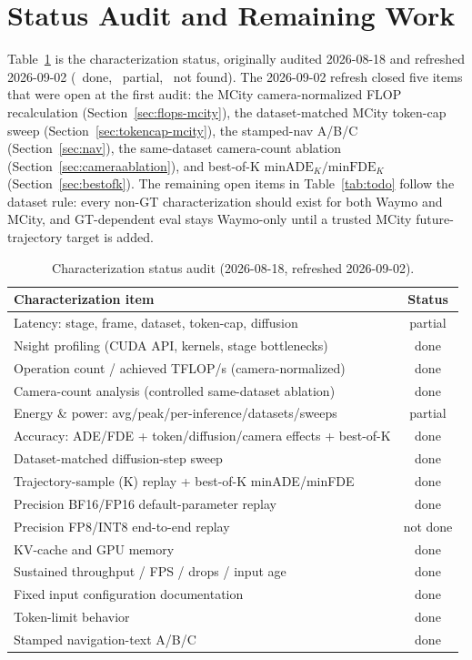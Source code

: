 \documentclass[11pt,a4paper]{article}
\begin{document}
\section{Status Audit and Remaining Work}
\label{sec:status}

Table~\ref{tab:audit} is the characterization status, originally audited
2026-08-18 and refreshed 2026-09-02 (~done, ~partial,
~not found). The 2026-09-02 refresh closed five items that were open at
the first audit: the MCity camera-normalized FLOP recalculation
(Section~\ref{sec:flops-mcity}), the dataset-matched MCity token-cap sweep
(Section~\ref{sec:tokencap-mcity}), the stamped-nav A/B/C
(Section~\ref{sec:nav}), the same-dataset camera-count ablation
(Section~\ref{sec:cameraablation}), and best-of-K $\mathrm{minADE}_K/\mathrm{minFDE}_K$
(Section~\ref{sec:bestofk}). The remaining open items in Table~\ref{tab:todo}
follow the dataset rule: every non-GT characterization should exist for both
Waymo and MCity, and GT-dependent eval stays Waymo-only until a trusted MCity
future-trajectory target is added.

\begin{table}[h]
\centering
\caption{Characterization status audit (2026-08-18, refreshed 2026-09-02).}
\label{tab:audit}
\small
\begin{tabular}{@{}p{8.6cm}c@{}}
\toprule
\textbf{Characterization item} & \textbf{Status} \\
\midrule
Latency: stage, frame, dataset, token-cap, diffusion & partial \\
Nsight profiling (CUDA API, kernels, stage bottlenecks) & done \\
Operation count / achieved TFLOP/s (camera-normalized) & done \\
Camera-count analysis (controlled same-dataset ablation) & done \\
Energy \& power: avg/peak/per-inference/datasets/sweeps & partial \\
Accuracy: ADE/FDE + token/diffusion/camera effects + best-of-K & done \\
Dataset-matched diffusion-step sweep & done \\
Trajectory-sample (K) replay + best-of-K minADE/minFDE & done \\
Precision BF16/FP16 default-parameter replay & done \\
Precision FP8/INT8 end-to-end replay & not done \\
KV-cache and GPU memory & done \\
Sustained throughput / FPS / drops / input age & done \\
Fixed input configuration documentation & done \\
Token-limit behavior & done \\
Stamped navigation-text A/B/C & done \\
\bottomrule
\end{tabular}
\end{table}
\end{document}
